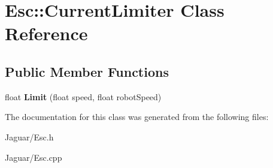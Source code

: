 \hypertarget{class_esc_1_1_current_limiter}{
\section{\-Esc\-:\-:\-Current\-Limiter \-Class \-Reference}
\label{class_esc_1_1_current_limiter}
}
\subsection*{\-Public \-Member \-Functions}
\begin{DoxyCompactItemize}
\item 
\hypertarget{class_esc_1_1_current_limiter_a1339971afdff2bf95902e516723cbe02}{
float {\bfseries \-Limit} (float speed, float robot\-Speed)}
\label{class_esc_1_1_current_limiter_a1339971afdff2bf95902e516723cbe02}

\end{DoxyCompactItemize}


\-The documentation for this class was generated from the following files\-:\begin{DoxyCompactItemize}
\item 
\-Jaguar/\-Esc.\-h\item 
\-Jaguar/\-Esc.\-cpp\end{DoxyCompactItemize}
